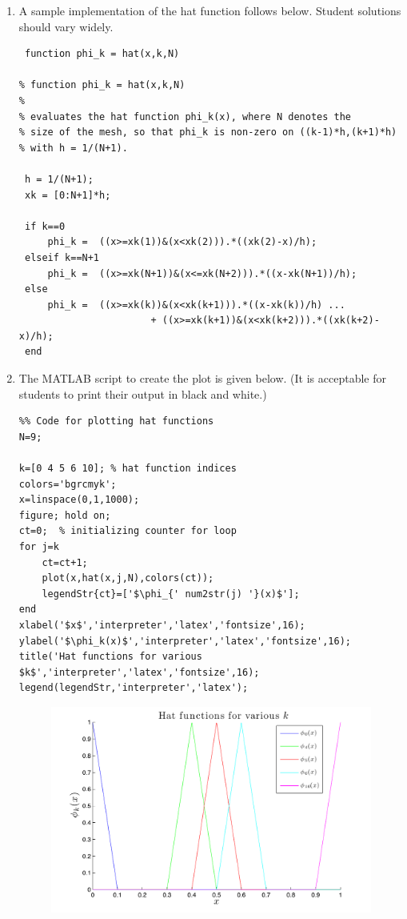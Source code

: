 \begin{solution}
\begin{enumerate}
\item  A sample implementation of the hat function follows below.
       Student solutions should vary widely.
\small
\begin{verbatim}
 function phi_k = hat(x,k,N)

% function phi_k = hat(x,k,N)
%
% evaluates the hat function phi_k(x), where N denotes the
% size of the mesh, so that phi_k is non-zero on ((k-1)*h,(k+1)*h)
% with h = 1/(N+1). 

 h = 1/(N+1);
 xk = [0:N+1]*h;

 if k==0       
     phi_k =  ((x>=xk(1))&(x<xk(2))).*((xk(2)-x)/h);
 elseif k==N+1
     phi_k =  ((x>=xk(N+1))&(x<=xk(N+2))).*((x-xk(N+1))/h);
 else          
     phi_k =  ((x>=xk(k))&(x<xk(k+1))).*((x-xk(k))/h) ...
                       + ((x>=xk(k+1))&(x<xk(k+2))).*((xk(k+2)-x)/h);
 end
 \end{verbatim}
 \normalsize
 \item The MATLAB script to create the plot is given below.
       (It is acceptable for students to print their output in 
       black and white.)
 \small
\begin{verbatim}
%% Code for plotting hat functions
N=9;

k=[0 4 5 6 10]; % hat function indices
colors='bgrcmyk';
x=linspace(0,1,1000);
figure; hold on;
ct=0;  % initializing counter for loop
for j=k
    ct=ct+1;
    plot(x,hat(x,j,N),colors(ct));
    legendStr{ct}=['$\phi_{' num2str(j) '}(x)$'];
end
xlabel('$x$','interpreter','latex','fontsize',16);
ylabel('$\phi_k(x)$','interpreter','latex','fontsize',16);
title('Hat functions for various $k$','interpreter','latex','fontsize',16);
legend(legendStr,'interpreter','latex');
 \end{verbatim}
 \normalsize
\begin{figure}
\centering
\includegraphics[width=.7\columnwidth]{./hatfxnsplot}
\caption{}
\end{figure}
 
\end{enumerate}
\end{solution}

